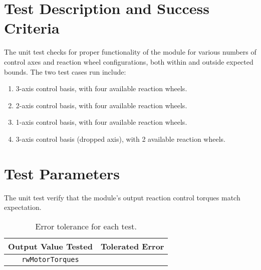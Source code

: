 
\section{Test Description and Success Criteria}
The unit test checks for proper functionality of the module for various numbers of control axes and reaction wheel configurations, both within and outside expected bounds. The two test cases run include:
\begin{enumerate}
\item 3-axis control basis, with four available reaction wheels. 
\item 2-axis control basis, with four available reaction wheels. 
\item 1-axis control basis, with four available reaction wheels. 
\item 3-axis control basis (dropped axis), with 2 available reaction wheels. 

\end{enumerate}


\section{Test Parameters}

The unit test verify that the module's output reaction control torques match expectation.
\begin{table}[htbp]
	\caption{Error tolerance for each test.}
	\label{tab:errortol}
	\centering \fontsize{10}{10}\selectfont
	\begin{tabular}{ c | c } %
		\hline\hline
		\textbf{Output Value Tested}  & \textbf{Tolerated Error}  \\ 
		\hline
		{\tt rwMotorTorques}        & 	   \\ 
		\hline\hline
	\end{tabular}
\end{table}




